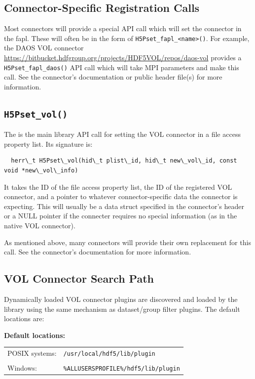 \subsection{Connector-Specific Registration Calls}

Most connectors will provide a special API call which will set the connector in the fapl. These will often be in the form of {\tt H5Pset\_fapl\_<name>()}. For example, the DAOS VOL connector \url{https://bitbucket.hdfgroup.org/projects/HDF5VOL/repos/daos-vol} provides a {\tt H5Pset\_fapl\_daos()} API call which will take MPI parameters and make this call. See the connector's documentation or public header file(s) for more information.

\subsection{\tt H5Pset\_vol()}

The is the main library API call for setting the VOL connector in a file access property list. Its signature is:

\begin{lstlisting}
  herr\_t H5Pset\_vol(hid\_t plist\_id, hid\_t new\_vol\_id, const void *new\_vol\_info)
\end{lstlisting}

It takes the ID of the file access property list, the ID of the registered VOL connector, and a pointer to whatever connector-specific data the connector is expecting. This will usually be a data struct specified in the connector's header or a NULL pointer if the connecter requires no special information (as in the native VOL connector).

As mentioned above, many connectors will provide their own replacement for this call. See the connector's documentation for more information.

\subsection{VOL Connector Search Path}

Dynamically loaded VOL connector plugins are discovered and loaded by the library using the same mechanism as dataset/group filter plugins. The default locations are:

\textbf{Default locations:}

\begin{tabular}{ l l }
    POSIX systems: &  {\tt /usr/local/hdf5/lib/plugin} \\
     & \\
    Windows: & {\tt \%ALLUSERSPROFILE\%/hdf5/lib/plugin}
\end{tabular}

